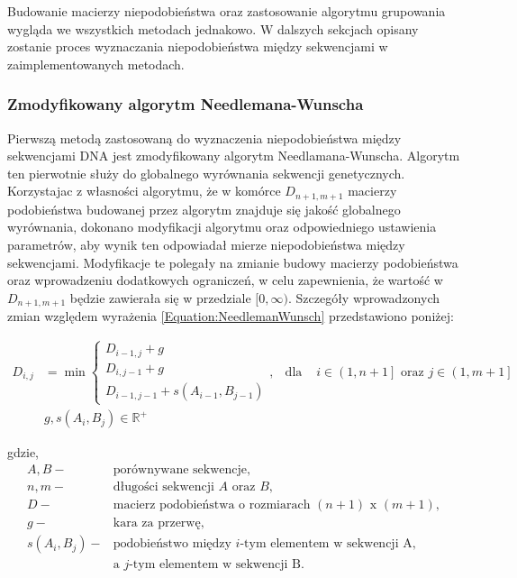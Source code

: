         Budowanie macierzy niepodobieństwa oraz zastosowanie algorytmu grupowania wygląda we wszystkich metodach jednakowo. W dalszych sekcjach opisany zostanie proces wyznaczania niepodobieństwa między sekwencjami w zaimplementowanych metodach.
        
        \subsubsection{Zmodyfikowany algorytm Needlemana-Wunscha}\label{Method:NeedlemanWunsch}

            Pierwszą metodą zastosowaną do wyznaczenia niepodobieństwa między sekwencjami DNA jest  zmodyfikowany algorytm Needlamana-Wunscha. Algorytm ten pierwotnie służy do globalnego wyrównania sekwencji genetycznych. Korzystajac z własności algorytmu, że w komórce $D_{n+1, m+1}$ macierzy podobieństwa budowanej przez algorytm znajduje się jakość globalnego wyrównania, dokonano modyfikacji algorytmu oraz odpowiedniego ustawienia parametrów, aby wynik ten odpowiadał mierze niepodobieństwa między sekwencjami. Modyfikacje te polegały na zmianie budowy macierzy podobieństwa oraz wprowadzeniu dodatkowych ograniczeń, w celu zapewnienia, że wartość w $D_{n+1, m+1}$ będzie zawierała się w przedziale $[0, \infty)$. Szczegóły wprowadzonych zmian względem wyrażenia \eqref{Equation:NeedlemanWunsch} przedstawiono poniżej:

            \begin{equation}
                \begin{aligned}
                    D_{i,j} &= \min
                    \begin{cases}
                    D_{i - 1, j} + g \\
                    D_{i, j - 1} + g \\
                    D_{i - 1, j - 1} + s(A_{i - 1}, B_{j - 1})
                    \end{cases}, & \text{dla } & i \in \left(1, n + 1\right] \text{ oraz } j \in \left(1, m + 1\right] \\
                    & g, s(A_i, B_j) \in \mathbb{R}^{+}
                \end{aligned}
            \end{equation}

            gdzie,
            \begin{align*} 
                A, B -& \text{porównywane sekwencje}, \\
                n, m -& \text{długości sekwencji } A \text{ oraz } B, \\
                D -& \text{macierz podobieństwa o rozmiarach } (n + 1) \text{ x } (m + 1), \\
                g -& \text{kara za przerwę}, \\
                s(A_i, B_j) -& \text{podobieństwo między  } i\text{-tym elementem w sekwencji A,} \\ 
                & \text{a } j \text{-tym elementem w sekwencji B}. \\
            \end{align*}

